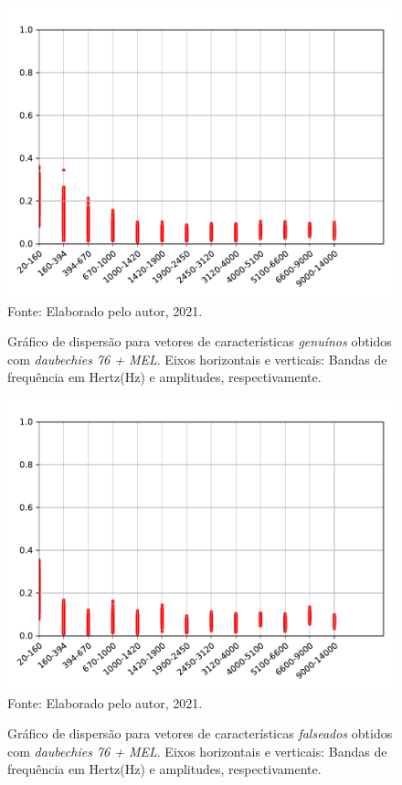 \begin{figure}[H]
	\centering
	\caption{Gráfico de dispersão para vetores de características \textit{genuínos} obtidos com \textit{daubechies 76 + MEL}.  Eixos horizontais e verticais: Bandas de frequência em Hertz(Hz) e amplitudes, respectivamente.}
	\includegraphics[scale=.8]{./images/results/barkVersusMel/Genuine_daub76_Mel.pdf}
	\label{fig:livedaub76mel}
	\\Fonte: Elaborado pelo autor, 2021.
\end{figure}
\begin{figure}[H]
	\centering
	\caption{Gráfico de dispersão para vetores de características \textit{falseados} obtidos com \textit{daubechies 76 + MEL}.  Eixos horizontais e verticais: Bandas de frequência em Hertz(Hz) e amplitudes, respectivamente.}
	\includegraphics[scale=.8]{./images/results/barkVersusMel/Spoofing_daub76_Mel.pdf}
	\label{fig:spoofingdaub76mel}
	\\Fonte: Elaborado pelo autor, 2021.
\end{figure}